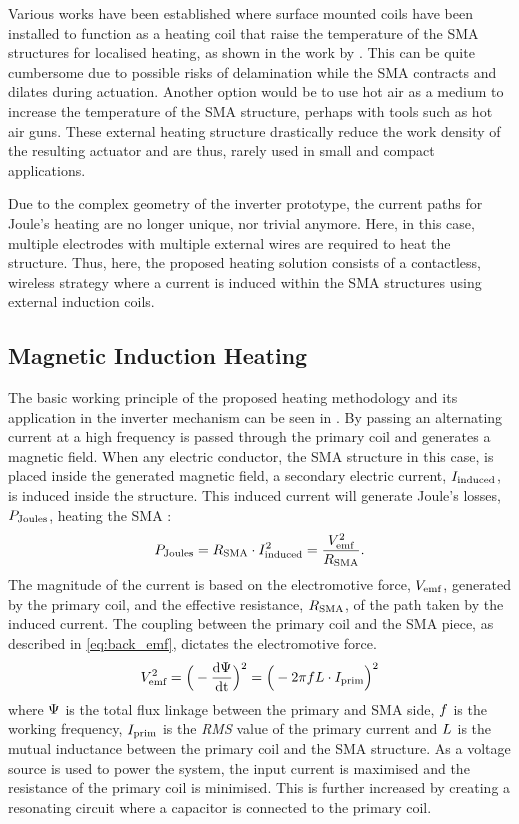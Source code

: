 Various works have been established where surface mounted coils have been installed to function as a heating coil that raise the temperature of the SMA structures for localised heating, as shown in the work by \todocite. This can be quite cumbersome due to possible risks of delamination while the SMA contracts and dilates during actuation. Another option would be to use hot air as a medium to increase the temperature of the SMA structure, perhaps with tools such as hot air guns. These external heating structure drastically reduce the work density of the resulting actuator and are thus, rarely used in small and compact applications.

Due to the complex geometry of the inverter prototype, the current paths for Joule's heating are no longer unique, nor trivial anymore. Here, in this case, multiple electrodes with multiple external wires are required to heat the structure. Thus, here, the proposed heating solution consists of a contactless, wireless strategy where a current is induced within the SMA structures using external induction coils.
\subsection{Magnetic Induction Heating}
The basic working principle of the proposed heating methodology and its application in the inverter mechanism can be seen in \todocite. By passing an alternating current at a high frequency is passed through the primary coil and generates a magnetic field. When any electric conductor, the SMA structure in this case, is placed inside the generated magnetic field, a secondary electric current, $I_\text{induced}$, is induced inside the structure. This induced current will generate Joule's losses, $P_\text{Joules}$, heating the SMA :
\begin{equation}
    P_\text{Joules} = R_\text{SMA} \cdot I_\text{induced}^2 = \frac{V_\text{emf}^2}{R_\text{SMA}}.
\end{equation}
The magnitude of the current is based on the electromotive force, $V_\text{emf}$, generated by the primary coil, and the effective resistance, $R_\text{SMA}$, of the path taken by the induced current. The coupling between the primary coil and the SMA piece, as described in \cref{eq:back_emf}, dictates the electromotive force.
\begin{equation}
    \label{eq:back_emf}
    V_\text{emf}^2 = \Big(-\frac{\text{d}\Psi}{\text{dt}}\Big)^2 = \Big(- 2\pi f L \cdot I_\text{prim} \Big)^2
\end{equation}
where $\Psi$ is the total flux linkage between the primary and SMA side, $f$ is the working frequency, $I_\text{prim}$ is the \textit{RMS} value of the primary current and $L$ is the mutual inductance between the primary coil and the SMA structure. As a voltage source is used to power the system, the input current is maximised and the resistance of the primary coil is minimised. This is further increased by creating a resonating circuit where a capacitor is connected to the primary coil.

